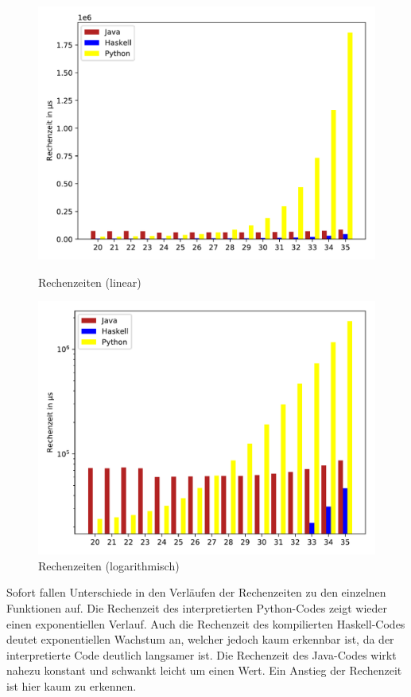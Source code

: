 \documentclass[11pt, parskip=half]{scrartcl}       %
\begin{document}
\begin{figure}[h]
  \centering
  \begin{minipage}[b]{0.49\textwidth}
    \includegraphics[width=\textwidth]{src/linear-standalone.pdf}
    \caption{Rechenzeiten (linear)}
  \end{minipage}
  \hfill
  \begin{minipage}[b]{0.49\textwidth}
    \includegraphics[width=\textwidth]{src/log-standalone.pdf}
    \caption{Rechenzeiten (logarithmisch)}
  \end{minipage}
\end{figure}

Sofort fallen Unterschiede in den Verläufen der Rechenzeiten zu den einzelnen Funktionen auf.
Die Rechenzeit des interpretierten Python-Codes zeigt wieder einen exponentiellen Verlauf.
Auch die Rechenzeit des kompilierten Haskell-Codes deutet exponentiellen Wachstum an, welcher jedoch kaum erkennbar ist, da der interpretierte Code deutlich langsamer ist.
Die Rechenzeit des Java-Codes wirkt nahezu konstant und schwankt leicht um einen Wert.
Ein Anstieg der Rechenzeit ist hier kaum zu erkennen.
\end{document}
